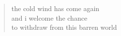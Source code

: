 
\begin{verse}
the cold wind has come again \\
and i welcome the chance \\
to withdraw from this barren world
\end{verse}
